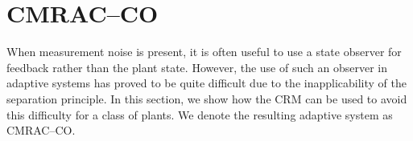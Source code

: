 \documentclass[10pt,journal]{IEEEtran}
\theoremstyle{plain}%
\theoremstyle{definition}
\newtheorem{rem}{Remark}
\begin{document}
%




\section{CMRAC--CO} 
When measurement noise is present, it is often useful to
use a state observer for feedback rather than the plant state.
However, the use of such an observer in adaptive systems
has proved to be quite difficult due to the inapplicability of
the separation principle. In this section, we show how the
CRM can be used to avoid this difficulty for a class of plants.
We denote the resulting adaptive system as CMRAC--CO.
\end{document}
